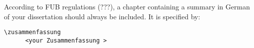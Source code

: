 \zusammenfassung
According to FUB regulations (???), a chapter containing a summary in German of your dissertation should always be included.
It is specified by:
\begin{verbatim}
\zusammenfassung
      <your Zusammenfassung >
\end{verbatim}
